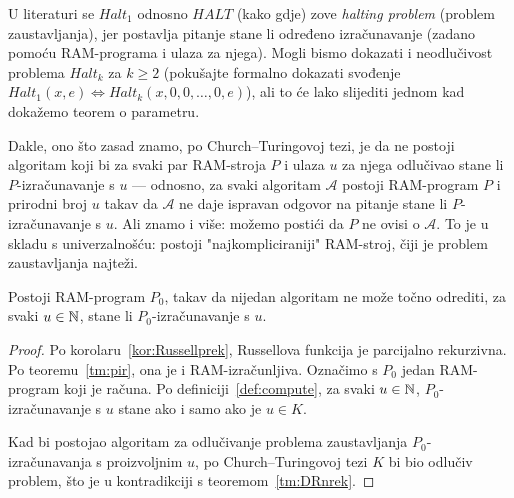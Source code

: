 U literaturi se $Halt_1$ odnosno $HALT$ (kako gdje) zove \emph{halting problem} (problem zaustavljanja), jer postavlja pitanje stane li određeno izračunavanje (zadano pomoću RAM-programa i ulaza za njega). Mogli bismo dokazati i neodlučivost problema $Halt_k$ za $k\ge 2$ (pokušajte formalno dokazati svođenje $Halt_1(x,e)\Leftrightarrow Halt_k(x,0,0,\dotsc,0,e)$), ali to će lako slijediti jednom kad dokažemo teorem o parametru.

Dakle, ono što zasad znamo, po Church--\!Turingovoj tezi, je da ne postoji algoritam koji bi za svaki par RAM-stroja $P$ i ulaza $u$ za njega odlučivao stane li $P$-izračunavanje s $u$ --- odnosno, za svaki algoritam $\mathcal A$ postoji RAM-program $P$ i prirodni broj $u$ takav da $\mathcal A$ ne daje ispravan odgovor na pitanje stane li $P$-izračunavanje s $u$. Ali znamo i više: možemo postići da $P$ ne ovisi o $\mathcal A$. To je u skladu s univerzalnošću: postoji "najkompliciraniji" RAM-stroj, čiji je problem zaustavljanja najteži.

\begin{korolar}[{name=[neodlučivost problema zaustavljanja za jedan fiksni RAM-stroj]}]\label{kor:RAMhaltnodl}
Postoji RAM-program $P_0$, takav da nijedan algoritam ne može točno odrediti, za svaki $u\in{\mathbb N}$, stane li $P_0$-izračunavanje s $u$.
\end{korolar}
\begin{proof}
Po korolaru~\ref{kor:Russellprek}, Russellova funkcija je parcijalno rekurzivna. Po teoremu~\ref{tm:pir}, ona je i RAM-izračunljiva. Označimo s $P_0$ jedan RAM-program koji je računa. Po definiciji~\ref{def:compute}, za svaki $u\in{\mathbb N}$, $P_0$-izračunavanje s $u$ stane ako i samo ako je $u\in K$.

Kad bi postojao algoritam za odlučivanje problema zaustavljanja $P_0$-izračunavanja s proizvoljnim $u$, po Church--\!Turingovoj tezi $K$ bi bio odlučiv problem, što je u kontradikciji s teoremom~\ref{tm:DRnrek}.
\end{proof}

